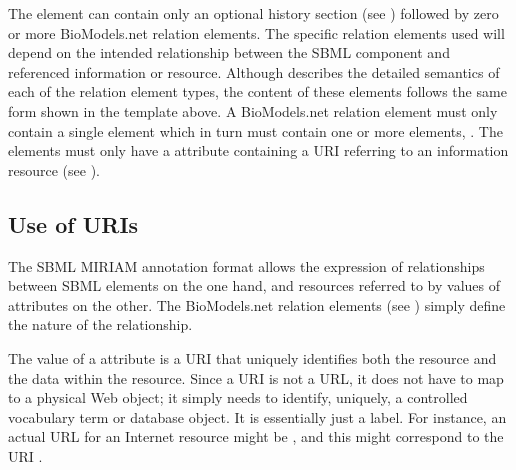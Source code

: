The  element can contain only an optional
history section (see )
followed by zero or more BioModels.net relation elements.  The
specific relation elements used will depend on the intended
relationship between the SBML component and referenced information
or resource.  Although 
describes the detailed semantics of each of the relation element
types, the content of these elements follows the same form shown
in the template above.  A BioModels.net relation element must only
contain a single  element which in turn must 
contain one or more  elements, .
The 
elements must only have a  attribute
containing a URI referring to an information resource (see
).




\subsection{Use of URIs}
\label{sec:uri-in-annotation}

The SBML MIRIAM annotation format allows the expression of
relationships between SBML elements on the one hand, and resources
referred to by values of  attributes on the
other.  The BioModels.net relation elements (see
) simply define the
nature of the relationship.

The value of a  attribute is a URI that
uniquely identifies both the resource and the data within the
resource.  Since a URI is not a URL, it does not have to map to a
physical Web object; it simply needs to identify, uniquely, a
controlled vocabulary term or database object.  It is essentially
just a label.  For instance, an actual URL for an Internet
resource might be , and
this might correspond to the URI  \citep{juty:2012}.

